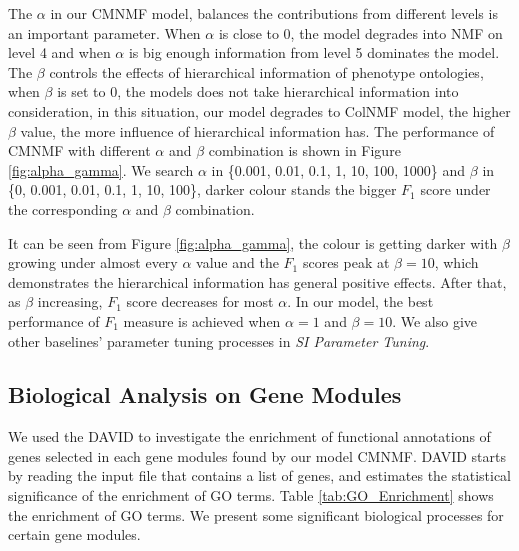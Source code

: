 \documentclass{bmcart}
\let\footnote=\endnote
\begin{document}
The $\alpha$ in our CMNMF model, balances the contributions from different levels is an important parameter. When $\alpha$ is close to 0, the model degrades into NMF on level 4 and when $\alpha$ is big enough information from level 5 dominates the model. The $\beta$ controls the effects of hierarchical information of phenotype ontologies, when $\beta$ is set to 0, the models does not take hierarchical information into consideration, in this situation, our model degrades to ColNMF model, the higher $\beta$ value, the more influence of hierarchical information has.
 The performance of CMNMF with different $\alpha$ and $\beta$ combination is shown in Figure \ref{fig:alpha_gamma}. We search $\alpha$ in \{0.001, 0.01, 0.1, 1, 10, 100, 1000\} and $\beta$ in \{0, 0.001, 0.01, 0.1, 1, 10, 100\}, darker colour stands the bigger $F_1$ score under the corresponding $\alpha$ and $\beta$ combination.

It can be seen from Figure \ref{fig:alpha_gamma}, the colour is getting darker with $\beta$ growing under almost every $\alpha$ value and the $F_1$ scores peak at $\beta=10$, which demonstrates the hierarchical information has general positive effects. After that, as $\beta$ increasing, $F_1$ score decreases for most $\alpha$. In our model, the best performance of $F_1$ measure is achieved when $\alpha=1$ and $\beta = 10$. We also give other baselines' parameter tuning processes in {\emph{SI Parameter Tuning}}.

\subsection*{\textbf{Biological Analysis on Gene Modules}}%

We used the DAVID \cite{Dennis2003} to investigate the enrichment of functional annotations of genes selected in each gene modules found by our model CMNMF. DAVID\footnote{https://david.ncifcrf.gov/summary.jsp} starts by reading the input file that contains a list of genes, and estimates the statistical significance of the enrichment of GO terms.
Table \ref{tab:GO_Enrichment} shows the enrichment of GO terms. We present some significant biological processes for certain  gene modules.
\end{document}

